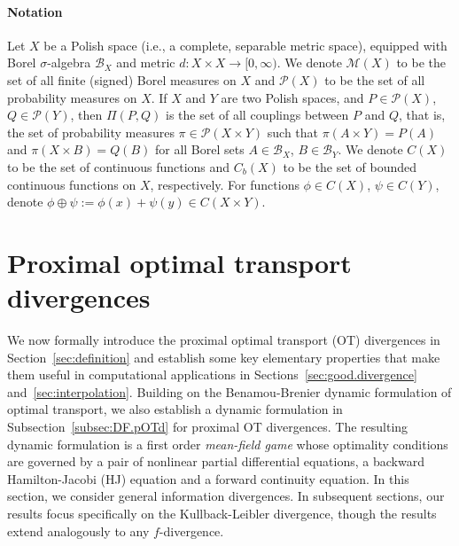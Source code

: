 \documentclass{amsart}
\newcommand{\BZ}[1]{\textcolor{olive}{BZ: #1}}
\newcommand{\rb}[1]{#1} %
\theoremstyle{definition}
\theoremstyle{remark}
\numberwithin{equation}{section}
\begin{document}
\paragraph*{\textbf{Notation}} Let $X$ be a Polish space (i.e., a complete, separable metric space), equipped with Borel $\sigma$-algebra $\mathcal{B}_X$ and metric $d: X\times X \to [0,\infty)$. We denote $\mathcal{M}(X)$ to be the set of all finite (signed) Borel measures on $X$ and $\mathcal{P}(X)$ to be the set of all probability measures on $X$. If $X$ and $Y$ are two Polish spaces, and $P\in \mathcal{P}(X)$, $Q \in \mathcal{P}(Y)$, then $\Pi(P,Q)$ is the set of all couplings between $P$ and $Q$, that is, the set of probability measures $\pi \in \mathcal{P}(X\times Y)$ such that $\pi(A\times Y) = P(A)$ and $\pi(X\times B) = Q(B)$ for all Borel sets $A \in \mathcal{B}_X$, $B \in \mathcal{B}_Y$. 
We denote $C(X)$ to be the set of continuous functions and $C_b(X)$ to be the set of bounded continuous functions on $X$, respectively. For functions $\phi\in C(X)$, $\psi \in C(Y)$, denote $\phi\oplus \psi := \phi(x) + \psi(y) \in C(X\times Y)$. 

\section{Proximal optimal transport divergences}
\label{sec:proximalOT}


We now formally introduce the proximal optimal transport (OT) divergences \rb{in Section~\ref{sec:definition}} and establish some key elementary properties that make them useful in computational applications \rb{in Sections~\ref{sec:good.divergence} and~\ref{sec:interpolation}}. Building on the Benamou-Brenier dynamic formulation of optimal transport, we also establish a dynamic formulation in Subsection~\ref{subsec:DF.pOTd} for proximal OT divergences. The resulting dynamic formulation is a first order \emph{mean-field game} \cite{lasry2007mean} whose optimality conditions are governed by a pair of nonlinear partial differential equations, a backward Hamilton-Jacobi (HJ) equation and a forward continuity equation. In this section, we consider general information divergences. In subsequent sections, our results focus specifically on the Kullback-Leibler divergence, though the results extend analogously to any $f$-divergence. 
\end{document}
